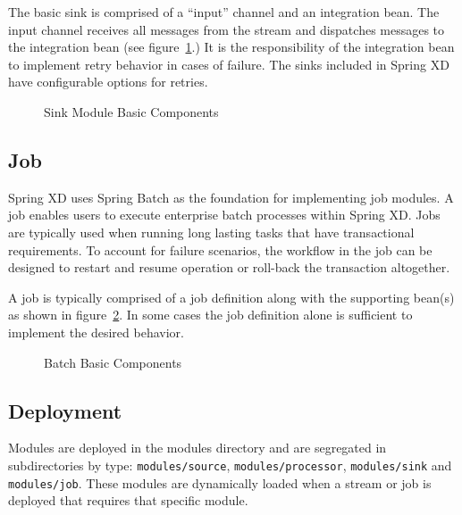 \par

The basic sink is comprised of a ``input'' channel and an integration bean.
The input channel receives all messages from the stream and dispatches
messages to the integration bean (see figure~\ref{fig:sinkmbc}.) It is the responsibility 
of the integration bean to implement retry behavior in cases of failure. The sinks 
included in Spring XD have configurable options for retries.

\par

\begin{figure}
\centering
{}
\caption{Sink Module Basic Components}
\label{fig:sinkmbc}
\end{figure}

\par

\subsection{Job}
Spring XD uses Spring Batch \cite{spring-batch-reference} as the foundation for implementing
job modules. A job enables users to execute enterprise batch processes within Spring XD.
Jobs are typically used when running long lasting tasks that have transactional requirements.
To account for failure scenarios, the workflow in the job can be designed to restart and 
resume operation or roll-back the transaction altogether.

\par

A job is typically comprised of a job definition along with the supporting
bean(s) as shown in figure~\ref{fig:batchmbc}.
In some cases the job definition alone is sufficient to implement the desired behavior.

\par

\begin{figure}
\centering
{}
\caption{Batch Basic Components}
\label{fig:batchmbc}
\end{figure}

\par 

\subsection{Deployment}
Modules are deployed in the modules directory and are segregated in
subdirectories by type: \texttt{modules/source}, \texttt{modules/processor}, 
\texttt{modules/sink} and \texttt{modules/job}.
These modules are dynamically loaded when a stream or job is deployed that requires that
specific module.

